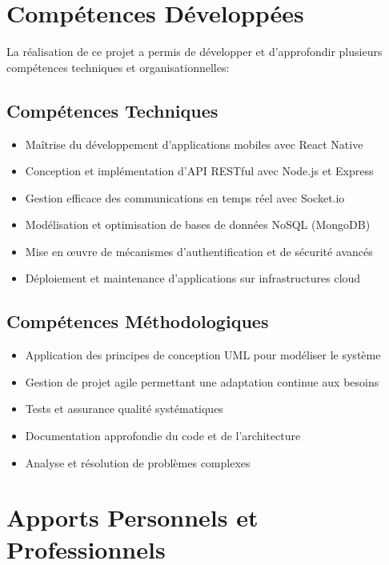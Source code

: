 \section{Compétences Développées}

La réalisation de ce projet a permis de développer et d'approfondir plusieurs compétences techniques et organisationnelles:

\subsection{Compétences Techniques}

\begin{itemize}
    \item Maîtrise du développement d'applications mobiles avec React Native
    \item Conception et implémentation d'API RESTful avec Node.js et Express
    \item Gestion efficace des communications en temps réel avec Socket.io
    \item Modélisation et optimisation de bases de données NoSQL (MongoDB)
    \item Mise en œuvre de mécanismes d'authentification et de sécurité avancés
    \item Déploiement et maintenance d'applications sur infrastructures cloud
\end{itemize}

\subsection{Compétences Méthodologiques}

\begin{itemize}
    \item Application des principes de conception UML pour modéliser le système
    \item Gestion de projet agile permettant une adaptation continue aux besoins
    \item Tests et assurance qualité systématiques
    \item Documentation approfondie du code et de l'architecture
    \item Analyse et résolution de problèmes complexes
\end{itemize}

\section{Apports Personnels et Professionnels}

